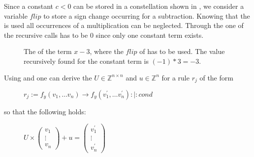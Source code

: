 Since a constant $c < 0$ can be stored in a constellation shown in , we consider a variable $flip$ to store a sign change occurring for a subtraction. Knowing that the \stdLinInt is used all occurrences of a multiplication can be neglected.\newline %
Through the \stdLinInt one of the recursive calls has to be $0$ since only one constant term exists.

\begin{figure}
	\centering
	\caption{The \rpntree of the term $x-3$, where the $flip$ of  has to be used. The value recursively found for the constant term is $(-1)*3 = -3$.}
	\label{ex:constant-term-minus}
\end{figure}

\FloatBarrier

Using  and  one can derive the \updatematrix $U \in \mathbb{Z}^{n\times n}$ and \updateconstants $u \in \mathbb{Z}^n$ for a rule $r_j$ of the form
\begin{figure}[H]
	\centering
	$r_j:= f_y(v_1,\dots v_n) \rightarrow f_y(v^\prime_1,\dots v^\prime_n) :|: cond$
\end{figure}  
so that the following holds:
\begin{figure}[H]
	\centering
	$U \times \begin{pmatrix} v_1 \\ \vdots \\ v_n \end{pmatrix} + u = \begin{pmatrix} v^\prime_1 \\ \vdots \\ v^\prime_n \end{pmatrix}$
\end{figure}

